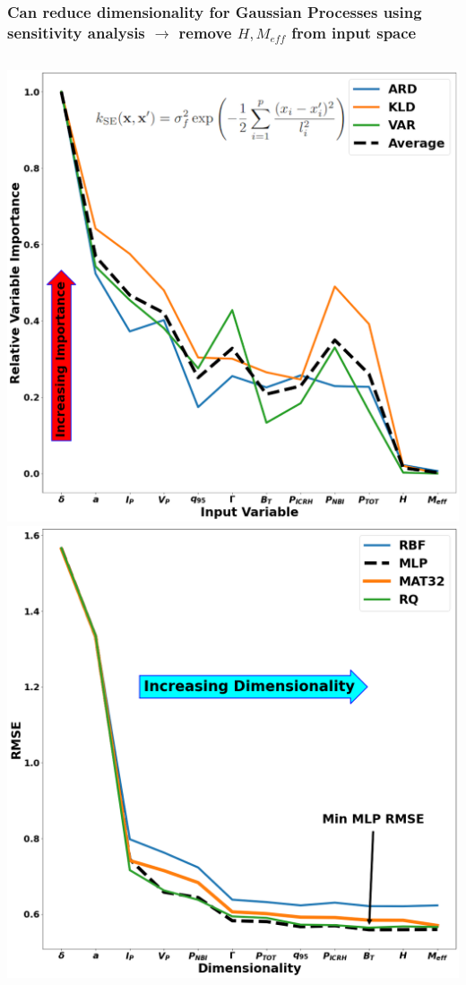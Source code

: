 \documentclass{beamer}
\begin{document}
\begin{frame}
\frametitle{Can reduce dimensionality for Gaussian Processes using sensitivity analysis $\rightarrow$ remove $H, M_{eff}$ from input space}
\begin{columns}
\includegraphics[scale=0.15]{./src/GP_sensitivity_analysis_final_V1_weq}
\includegraphics[scale=0.15]{./src/final_GP_dim_v2}
\end{columns}
\end{frame}
\end{document}
